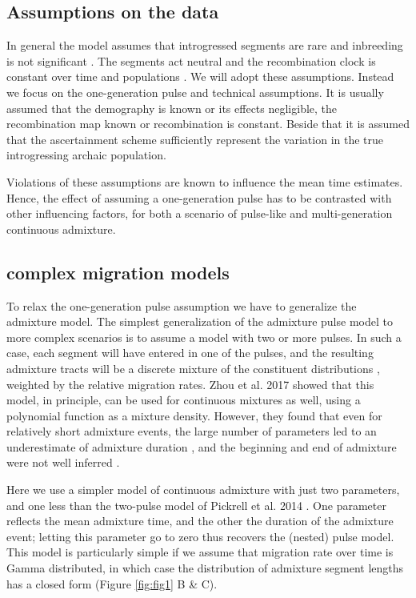\documentclass[]{article}
\begin{document}
\subsection{Assumptions on the data}\label{assumptions-on-the-data}

In general the model assumes that introgressed segments are rare and inbreeding is not significant \citep{pool_inference_2009}. The segments act neutral \citep{shchur_distribution_2019} and the recombination clock is constant over time and populations \citep{gravel_population_2012}. We will adopt these assumptions. Instead we focus on the one-generation pulse and technical assumptions. It is usually assumed that the demography is known or its effects negligible, the recombination map known or recombination is constant. Beside that it is assumed that the ascertainment scheme sufficiently represent the variation in the true introgressing archaic population.

Violations of these assumptions are known to influence the mean time
estimates. Hence, the effect of assuming a one-generation pulse has to
be contrasted with other influencing factors, for both a scenario of
pulse-like and multi-generation continuous admixture. 


\subsection{complex migration models}

To relax the one-generation pulse assumption we have to generalize the admixture model.
The simplest generalization of the admixture pulse model to more complex scenarios is to assume a model with two or more pulses. In such a case,  each segment will have entered in one of the pulses, and the resulting admixture tracts will be a discrete mixture of the constituent distributions \citep{pickrell_ancient_2014}, weighted by the relative migration rates. Zhou et al. 2017 \citep{zhou_modeling_2017} showed that this model, in principle, can be used for continuous mixtures as well, using a polynomial function as a mixture density. However, they found that even for relatively short admixture events, the large number of parameters led to an underestimate of admixture duration \citep{zhou_inference_2017}, and the beginning and end of admixture were not well inferred
\citep{zhou_modeling_2017,zhou_inference_2017}. 

Here we use a simpler model of continuous admixture with just two parameters, and one less than the two-pulse model of Pickrell et al. 2014 \citep{pickrell_ancient_2014}. One parameter reflects the mean admixture time, and the other the duration of the admixture event; letting this parameter go to zero thus recovers the (nested) pulse model. 
This model is particularly simple if we assume that migration rate over time is Gamma distributed, in which case the distribution of admixture segment lengths has a closed form (Figure \ref{fig:fig1} B & C).
\end{document}
